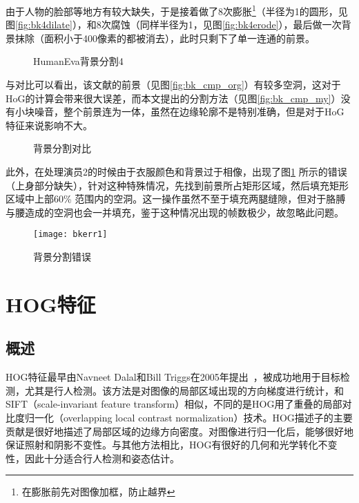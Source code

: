 由于人物的脸部等地方有较大缺失，于是接着做了8次膨胀\footnote{在膨胀前先对图像加框，防止越界}（半径为1的圆形，见图\ref{fig:bk4dilate}），和8次腐蚀（同样半径为1，见图\ref{fig:bk4erode}），最后做一次背景抹除（面积小于400像素的都被消去），此时只剩下了单一连通的前景。

\begin{figure}[htbp]
  \centering
  \caption{HumanEva背景分割4}
\end{figure}

与\cite{Poppe2007}对比可以看出，该文献的前景（见图\ref{fig:bk_cmp_org}）有较多空洞，这对于HoG的计算会带来很大误差，而本文提出的分割方法（见图\ref{fig:bk_cmp_my}）没有小块噪音，整个前景连为一体，虽然在边缘轮廓不是特别准确，但是对于HoG特征来说影响不大。

\begin{figure}[htbp]
  \centering
  \caption{背景分割对比}
\end{figure}

此外，在处理演员2的时候由于衣服颜色和背景过于相像，出现了图\ref{fig:bkerr} 所示的错误（上身部分缺失），针对这种特殊情况，先找到前景所占矩形区域，然后填充矩形区域中上部60\% 范围内的空洞。这一操作虽然不至于填充两腿缝隙，但对于胳膊与腰造成的空洞也会一并填充，鉴于这种情况出现的帧数极少，故忽略此问题。

\begin{figure}[htbp]
  \centering
  \texttt{[image: bkerr1]}
  \caption{背景分割错误}\label{fig:bkerr}
\end{figure}

\section{HOG特征}
\subsection{概述}
HOG特征最早由Navneet Dalal和Bill Triggs在2005年提出~\cite{Dalal05histogramsof}，被成功地用于目标检测，尤其是行人检测。该方法是对图像的局部区域出现的方向梯度进行统计，和SIFT（scale-invariant feature transform）相似，不同的是HOG用了重叠的局部对比度归一化（overlapping local contrast normalization）技术。HOG描述子的主要贡献是很好地描述了局部区域的边缘方向密度。对图像进行归一化后，能够很好地保证照射和阴影不变性。与其他方法相比，HOG有很好的几何和光学转化不变性，因此十分适合行人检测和姿态估计。

